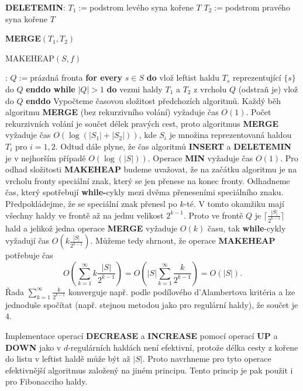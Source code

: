 \documentclass[a4paper,12pt]{article}
\begin{document}
{\bf DELETEMIN}:\newline 
$T_1:=$podstrom levého syna kořene $T$\newline 
$T_2:=$podstrom pravého syna kořene $T$\newline 
{\bf MERGE$(T_1,T_2)$

MAKEHEAP$(S,f)$}:\newline 
$Q:=$prázdná fronta\newline 
{\bf for every} $s\in S$ {\bf do\newline 
\phantom{{\rm ---}}}vlož leftist haldu $T_s$ reprezentující $
\{s\}$ do $Q$\newline 
{\bf enddo\newline 
while} $|Q|>1$ {\bf do\newline 
\phantom{{\rm ---}}}vezmi haldy $T_1$ a $T_2$ z vrcholu $Q$ 
(odstraň je)\newline 
\phantom{---}{\bf MERGE$(T_1,T_2)$} vlož do $Q$\newline 
{\bf enddo
}
Vypočteme časovou složitost předchozích 
algoritmů. Každý běh 
algoritmu {\bf MERGE} (bez rekurzivního volání) vyžaduje čas 
$O(1)$. Počet rekurzivních volání je součet délek pravých 
cest, proto algoritmus {\bf MERGE} vyžaduje čas $O(\log(|S_
1|+|S_2|))$, 
kde $S_i$ je množina reprezentovaná haldou $T_i$ pro $i=1,2$.
Odtud dále plyne, že čas algoritmů {\bf INSERT} a 
{\bf DELETE\-MIN} je v 
nejhorším případě $O(\log(|S|))$. Operace {\bf MIN} vyžaduje 
čas $O(1)$. Pro odhad složitosti {\bf MA\-KEHEAP} budeme 
uvažovat, že na začátku algoritmu je na vrcholu fronty 
speciální znak, který se jen přenese na konec fronty. 
Odhadneme čas, který spotřebují {\bf while-}cykly mezi dvě\-ma 
přeneseními speciálního znaku. Předpokládejme, že se 
spe\-ciál\-ní znak přenesl po $k$-té. V tomto okamžiku 
mají všechny haldy ve frontě až na jednu velikost $2^{
k-1}$. 
Proto ve frontě $Q$ je $\big\lceil \frac {|S|}{2^{k-1}}\big\rceil $ hald a jelikož jedna operace 
{\bf MERGE} vyžadu\-je $O(k)$ času, tak {\bf while}-cykly vyžadují 
čas $O(k\frac {|S|}{2^{k-1}})$. Můžeme tedy shrnout, že operace 
{\bf MAKEHEAP} potřebuje čas 
$$O(\sum_{k=1}^{\infty}k\frac {|S|}{2^{k-1}})=O(|S|\sum_{k=1}^{\infty}\frac 
k{2^{k-1}})=O(|S|).$$
Řada $\sum_{k=1}^{\infty}$$\frac k{2^{k-1}}$ konverguje např. podle podílového d'Alambertova 
kritéria a lze jednoduše spočítat (např. stejnou metodou 
jako pro regulární haldy), že součet je $4$.

Implementace operací {\bf DECREASE} a {\bf INCREASE} pomocí 
operací {\bf UP} a {\bf DOWN} jako v $d$-regulárních haldách není 
efektivní, protože délka cesty z kořene do listu v leftist haldě 
může být až $|S|$.  Proto navrhneme pro tyto operace 
efektivnější algoritmus založený na jiném principu.  Tento princip 
je pak použit i pro Fibonacciho haldy.  
\end{document}
